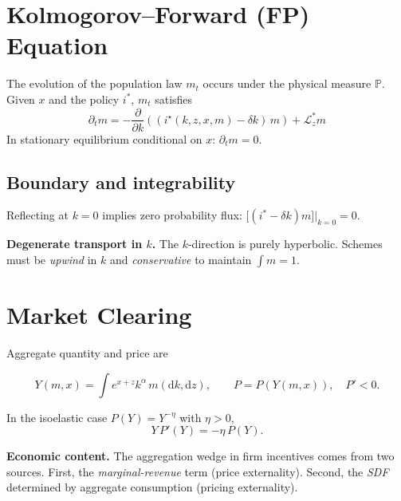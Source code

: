 \documentclass[11pt,letterpaper,oneside]{article}
\newcommand{\diff}{\mathrm{d}}
\newcommand{\Lzadj}{\mathcal{L}_z^{*}}
\newcommand{\extbf}[1]{\textbf{#1}}
\begin{document}
\section{Kolmogorov--Forward (FP) Equation}

The evolution of the population law $m_t$ occurs under the physical measure $\mathbb{P}$. Given $x$ and the policy $i^*$, $m_t$ satisfies
\begin{equation}
\partial_t m = -\frac{\partial}{\partial k}\left((i^\star(k,z,x,m)-\delta k)\, m\right) + \Lzadj m
\tag{FP}\label{eq:FP}
\end{equation}
In stationary equilibrium conditional on $x$: $\partial_t m=0$.

\subsection{Boundary and integrability}
Reflecting at $k=0$ implies zero probability flux:
$\big[(i^*-\delta k)m\big]\big|_{k=0}=0$.

\begin{tcolorbox}[mathstyle]
  \extbf{Degenerate transport in $k$.} The $k$-direction is purely hyperbolic. Schemes must be \emph{upwind} in $k$ and \emph{conservative} to maintain $\int m=1$.
\end{tcolorbox}

\section{Market Clearing}
Aggregate quantity and price are

$$
Y(m,x)=\int e^{x+z}k^\alpha\,m(\diff k,\diff z),\qquad P=P(Y(m,x)),\quad P'<0.
$$

In the isoelastic case $P(Y)=Y^{-\eta}$ with $\eta>0$,
\begin{equation}\label{eq:isoelastic}
Y\,P'(Y) = -\eta\, P(Y).
\end{equation}

\begin{tcolorbox}[didacticstyle]
  \extbf{Economic content.} The aggregation wedge in firm incentives comes from two sources. First, the \emph{marginal-revenue} term (price externality). Second, the \emph{SDF} determined by aggregate consumption (pricing externality).
\end{tcolorbox}

\end{document}
